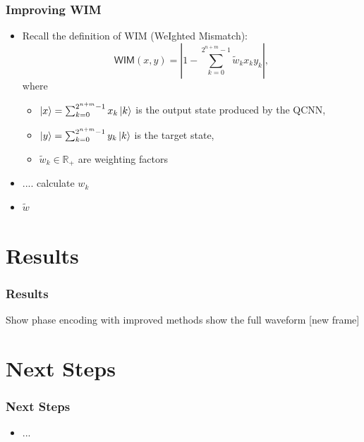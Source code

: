 \documentclass{beamer}
\begin{document}
\begin{frame}
\frametitle{Improving WIM}
\begin{itemize}
\item Recall the definition of \alert{WIM} (\alert{W}e\alert{I}ghted \alert{M}ismatch):
\begin{equation}
\mathsf{WIM}(x,y) =  \left\vert 1 - \sum_{k=0}^{2^{n+m}-1} \tilde{w}_k x_k y_k \right \vert, 
\end{equation}
where
\begin{itemize}
\item $\ket{x} = \sum_{k=0}^{2^{n+m}-1} x_k \ket{k} $ is the output state produced by the QCNN,
\item $\ket{y} = \sum_{k=0}^{2^{n+m}-1} y_k \ket{k} $ is the target state, 
\item $\tilde{w}_k \in \mathbb{R}_+$ are weighting factors 
\end{itemize}
\item .... calculate $w_k$
\item $\tilde{w}$
\end{itemize}
\end{frame}

\section{Results}

\begin{frame}
\frametitle{Results}
Show phase encoding with improved methods 
show the full waveform [new frame]
\end{frame}

\section{Next Steps}

\begin{frame}
\frametitle{Next Steps}
\begin{itemize}
\item ...
\end{itemize}
\end{frame}
\end{document}
